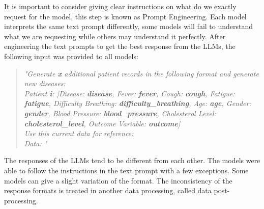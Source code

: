 It is important to consider giving clear instructions on what do we exactly request for the model, this step is known as Prompt Engineering. Each model interprets the same text prompt differently, some models will fail to understand what we are requesting while others may understand it perfectly. 
After engineering the text prompts to get the best response from the LLMs, the following input was provided to all models:

\begin{quote}
    \textit{
        "Generate \textbf{x} additional patient records in the following format and generate new diseases: \\
        Patient \textbf{i}: [Disease: \textbf{disease}, Fever: \textbf{fever}, Cough: \textbf{cough}, Fatigue: \textbf{fatigue}, Difficulty Breathing: \textbf{difficulty\_breathing}, Age: \textbf{age}, Gender: \textbf{gender}, Blood Pressure: \textbf{blood\_pressure}, Cholesterol Level: \textbf{cholesterol\_level}, Outcome Variable: \textbf{outcome}] \\
        Use this current data for reference: \\
        Data: "
    }
\end{quote}


The responses of the LLMs tend to be different from each other. The models were able to follow the instructions in the text prompt with a few exceptions. Some models can give a slight variation of the format. The inconsistency of the response formats is treated in another data processing, called data post-processing.

